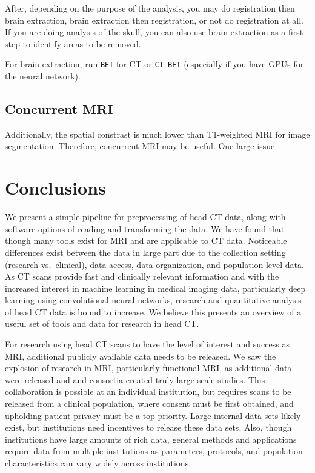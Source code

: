 \documentclass[]{elsarticle} %
\begin{document}
After, depending on the purpose of the analysis, you may do registration
then brain extraction, brain extraction then registration, or not do
registration at all. If you are doing analysis of the skull, you can
also use brain extraction as a first step to identify areas to be
removed.

For brain extraction, run \texttt{BET} for CT or \texttt{CT\_BET}
(especially if you have GPUs for the neural network).

\hypertarget{concurrent-mri}{%
\subsection{Concurrent MRI}\label{concurrent-mri}}

Additionally, the spatial constrast is much lower than T1-weighted MRI
for image segmentation. Therefore, concurrent MRI may be useful. One
large issue

\hypertarget{conclusions}{%
\section{Conclusions}\label{conclusions}}

We present a simple pipeline for preprocessing of head CT data, along
with software options of reading and transforming the data. We have
found that though many tools exist for MRI and are applicable to CT
data. Noticeable differences exist between the data in large part due to
the collection setting (research vs.~clinical), data access, data
organization, and population-level data. As CT scans provide fast and
clinically relevant information and with the increased interest in
machine learning in medical imaging data, particularly deep learning
using convolutional neural networks, research and quantitative analysis
of head CT data is bound to increase. We believe this presents an
overview of a useful set of tools and data for research in head CT.

For research using head CT scans to have the level of interest and
success as MRI, additional publicly available data needs to be released.
We saw the explosion of research in MRI, particularly functional MRI, as
additional data were released and and consortia created truly
large-scale studies. This collaboration is possible at an individual
institution, but requires scans to be released from a clinical
population, where consent must be first obtained, and upholding patient
privacy must be a top priority. Large internal data sets likely exist,
but institutions need incentives to release these data sets. Also,
though institutions have large amounts of rich data, general methods and
applications require data from multiple institutions as parameters,
protocols, and population characteristics can vary widely across
institutions.
\end{document}
